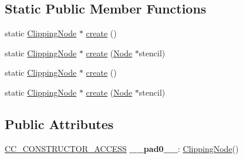 \subsection*{Static Public Member Functions}
\begin{DoxyCompactItemize}
\item 
static \hyperlink{classClippingNode}{Clipping\+Node} $\ast$ \hyperlink{classClippingNode_aa98229072cf68c1c7be9a1c7310b8ad4}{create} ()
\item 
static \hyperlink{classClippingNode}{Clipping\+Node} $\ast$ \hyperlink{classClippingNode_a61c10eedd27bd820bf9fa652f3c0e509}{create} (\hyperlink{classNode}{Node} $\ast$stencil)
\item 
static \hyperlink{classClippingNode}{Clipping\+Node} $\ast$ \hyperlink{classClippingNode_a028bfbb82ba7321390e16bada44086e9}{create} ()
\item 
static \hyperlink{classClippingNode}{Clipping\+Node} $\ast$ \hyperlink{classClippingNode_a6cce59a4e9c6b0705343945cd1a3aa71}{create} (\hyperlink{classNode}{Node} $\ast$stencil)
\end{DoxyCompactItemize}
\subsection*{Public Attributes}
\begin{DoxyCompactItemize}
\item 
\mbox{\label{classClippingNode_ac5dd311da91e2d3b13ae969a773fda36}} 
\hyperlink{_2cocos2d_2cocos_2base_2ccConfig_8h_a25ef1314f97c35a2ed3d029b0ead6da0}{C\+C\+\_\+\+C\+O\+N\+S\+T\+R\+U\+C\+T\+O\+R\+\_\+\+A\+C\+C\+E\+SS} {\bfseries \+\_\+\+\_\+pad0\+\_\+\+\_\+}\+: \hyperlink{classClippingNode}{Clipping\+Node}()
\end{DoxyCompactItemize}
